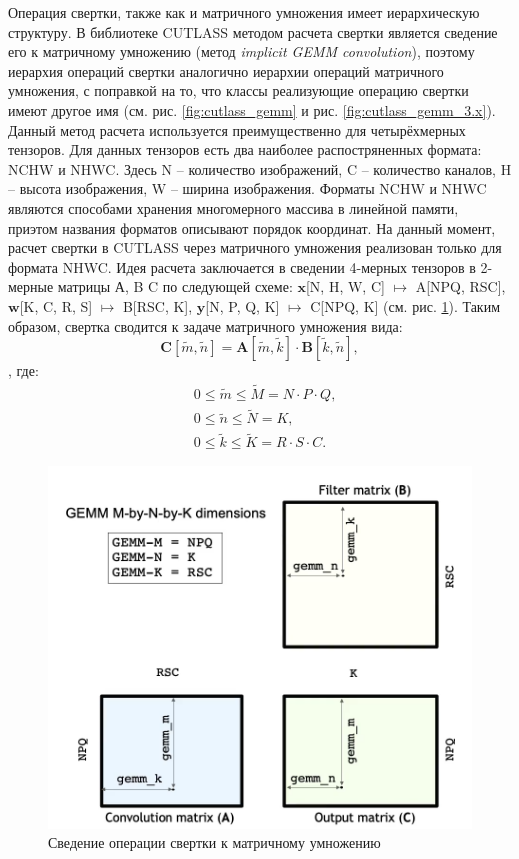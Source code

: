 Операция свертки, также как и матричного умножения имеет иерархическую структуру. В библиотеке CUTLASS методом расчета свертки является
сведение его к матричному умножению (метод \textit{implicit GEMM convolution}), поэтому иерархия операций свертки аналогично иерархии операций
матричного умножения, с поправкой на то, что классы реализующие операцию свертки имеют другое имя (см. рис. \ref{fig:cutlass_gemm} и рис.
\ref{fig:cutlass_gemm_3.x}). Данный метод расчета используется преимущественно для четырёхмерных тензоров. Для данных тензоров есть два наиболее
распостряненных формата: NCHW и NHWC. Здесь N -- количество изображений, C -- количество каналов, H -- высота изображения, W -- ширина изображения.
Форматы NCHW и NHWC являются способами хранения многомерного массива в линейной памяти, приэтом названия форматов описывают порядок координат.
На данный момент, расчет свертки в CUTLASS через матричного умножения реализован только для формата NHWC. Идея расчета заключается в сведении 4-мерных
тензоров в 2-мерные матрицы А, B C по следующей схеме: $\mathbf{x}$[N, H, W, C] $\mapsto$ A[NPQ, RSC], $\mathbf{w}$[K, C, R, S] $\mapsto$ B[RSC, K],
$\mathbf{y}$[N, P, Q, K] $\mapsto$ C[NPQ, K] (см. рис. \ref{fig:implicit_gemm_algo}). Таким образом, свертка сводится к задаче матричного умножения
вида:
\begin{equation}
\mathbf{C}[\tilde{m}, \tilde{n}] = \mathbf{A}[\tilde{m}, \tilde{k}] \cdot \mathbf{B}[\tilde{k}, \tilde{n}],
\end{equation},
где:
\begin{align}
&0 \leq \tilde{m} \leq \tilde{M} = N \cdot P \cdot Q, \\
&0 \leq \tilde{n} \leq \tilde{N} = K, \\
&0 \leq \tilde{k} \leq \tilde{K} = R \cdot S \cdot C.
\end{align}

\begin{figure}
    \centering
    \includegraphics[scale=0.5]{src/images/implicit_gemm_algo.png}
    \caption{Сведение операции свертки к матричному умножению}
    \label{fig:implicit_gemm_algo}
\end{figure}

